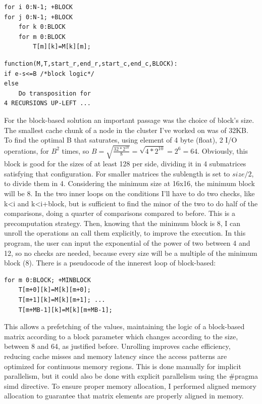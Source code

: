\begin{minipage}[t]{0.5\columnwidth} 
\begin{lstlisting}[style=Cstyle, caption={Block-Size}]
for i 0:N-1; +BLOCK
for j 0:N-1; +BLOCK
    for k 0:BLOCK
    for m 0:BLOCK
        T[m][k]=M[k][m];
\end{lstlisting}
\end{minipage}\hfill
\begin{minipage}[t]{0.5\columnwidth} 
\begin{lstlisting}[style=Cstyle, caption={Recursive}]
function(M,T,start_r,end_r,start_c,end_c,BLOCK):
if e-s<=B /*block logic*/
else
    Do transposition for 
4 RECURSIONS UP-LEFT ... 
\end{lstlisting}
\end{minipage}
For the block-based solution an important passage was the choice of block's size. The smallest cache chunk of a node in the cluster I've worked on was of 32KB. To find the optimal B that saturates, using element of 4 byte (float), 2 I/O operations, for $B^2$ times, so $B=\sqrt{\frac{32*2^{10}}{8}}=\sqrt{4*2^{10}}=2^6=64$. Obviously, this block is good for the sizes of at least 128 per side, dividing it in 4 submatrices satisfying that configuration. For smaller matrices the sublength is set to $size/2$, to divide them in 4. Considering the minimum size at 16x16, the minimum block will be 8. 
In the two inner loops on the conditions I'll have to do two checks, like k<i and k<i+block, but is sufficient to find the minor of the two to do half of the comparisons, doing a quarter of comparisons compared to before. This is a precomputation strategy. Then, knowing that the minimum block is 8, I can unroll the operations an call them explicitly, to improve the execution. In this program, the user can input the exponential of the power of two between 4 and 12, so no checks are needed, because every size will be a multiple of the minimum block (8). There is a pseudocode of the innerest loop of block-based:
\begin{lstlisting}[style=Cstyle, caption={Unroll}]
for m 0:BLOCK; +MINBLOCK
    T[m+0][k]=M[k][m+0];
    T[m+1][k]=M[k][m+1]; ... 
    T[m+MB-1][k]=M[k][m+MB-1];
\end{lstlisting}
This allows a prefetching of the values, maintaining the logic of a block-based matrix according to a block parameter which changes according to the size, between 8 and 64, as justified before.
Unrolling improves cache efficiency, reducing cache misses and memory latency since the access patterns are optimized for continuous memory regions. This is done manually for implicit parallelism, but it could also be done with explicit parallelism using the \#pragma simd directive. To ensure proper memory allocation, I performed aligned memory allocation to guarantee that matrix elements are properly aligned in memory.
